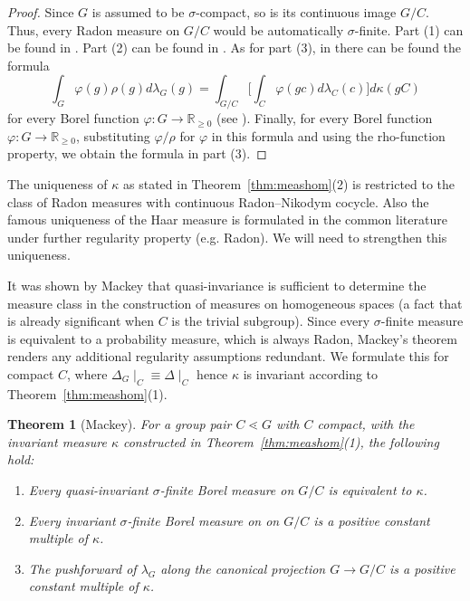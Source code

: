 \documentclass{amsart}
\numberwithin{equation}{subsection}
\newtheorem{thm}{Theorem}[section]
\begin{document}
\begin{proof}
Since \(G\) is assumed to be \(\sigma\)-compact, so is its continuous image \(G/C\). Thus, every Radon measure on \(G/C\) would be automatically \(\sigma\)-finite. Part (1) can be found in \cite[Theorem (2.49)]{folland1995course}. Part (2) can be found in \cite[Theorem (2.59)]{folland1995course}. As for part (3), in \cite[Theorem (2.56)]{folland1995course} there can be found the formula
\[\int_{G}\varphi\left(g\right)\rho\left(g\right)d\lambda_{G}\left(g\right)=\int_{G/C}\Big[\int_{C}\varphi\left(gc\right)d\lambda_{C}\left(c\right)\Big]d\kappa\left(gC\right)\]
for every Borel function \(\varphi:G\to\mathbb{R}_{\geq 0}\) (see \cite[\S2.7, pp. 64--65]{folland1995course}). Finally, for every Borel function \(\varphi:G\to\mathbb{R}_{\geq 0}\), substituting \(\varphi/\rho\) for \(\varphi\) in this formula and using the rho-function property, we obtain the formula in part (3). 
\end{proof}

The uniqueness of \(\kappa\) as stated in Theorem~\ref{thm:meashom}(2) is restricted to the class of Radon measures with continuous Radon--Nikodym cocycle. Also the famous uniqueness of the Haar measure is formulated in the common literature under further regularity property (e.g. Radon). We will need to strengthen this uniqueness.

It was shown by Mackey that quasi-invariance is sufficient to determine the measure class in the construction of measures on homogeneous spaces (a fact that is already significant when \(C\) is the trivial subgroup). Since every \(\sigma\)-finite measure is equivalent to a probability measure, which is always Radon, Mackey's theorem renders any additional regularity assumptions redundant. We formulate this for compact \(C\), where \(\varDelta_{G}\mid_{C}\equiv\varDelta\mid_{C}\) hence \(\kappa\) is invariant  according to Theorem~\ref{thm:meashom}(1).

\begin{thm}[Mackey]
\label{thm:haaruniq}
For a group pair \(C\lessdot G\) with \(C\) compact, with the invariant measure \(\kappa\) constructed in Theorem~\ref{thm:meashom}(1), the following hold:
\begin{enumerate}
    \item Every quasi-invariant \(\sigma\)-finite Borel measure on \(G/C\) is equivalent to \(\kappa\).
    \item Every invariant \(\sigma\)-finite Borel measure on on \(G/C\) is a positive constant multiple of \(\kappa\).
    \item The pushforward of \(\lambda_{G}\) along the canonical projection \(G\to G/C\) is a positive constant multiple of \(\kappa\).
\end{enumerate}
\end{thm}
\end{document}
